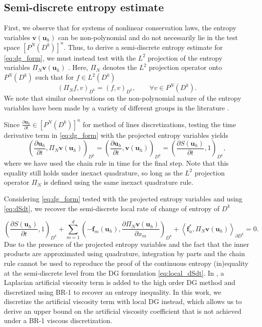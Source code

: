 \documentclass{elsarticle}
\theoremstyle{definition}
\theoremstyle{plain}
\theoremstyle{plain}
\newcommand{\pd}[2]{\frac{\partial#1}{\partial#2}}
\newcommand{\LRp}[1]{\left( #1 \right)} %
\newcommand{\LRs}[1]{\left[ #1 \right]} %
\newcommand{\LRa}[1]{\left\langle #1 \right\rangle} %
\newcommand{\refone}[1]{{\color{red}#1}}
\renewcommand{\refone}[1]{#1}
\begin{document}
\subsection{Semi-discrete entropy estimate}

First, we observe that for systems of nonlinear conservation laws, the entropy variables $\bm{v}(\bm{u}_h)$ can be non-polynomial and do not necessarily lie in the test space $\LRs{P^N(D^k)}^n$. Thus, to derive a semi-discrete entropy estimate for \eqref{eq:dg_form}, we must instead test with the $L^2$ projection of the entropy variables $\Pi_N \bm{v}(\bm{u}_h)$ \cite{chan2018discretely, chan2025artificial}. Here, $\Pi_N$ denotes the $L^2$ projection operator onto $P^N(D^k)$ such that for $f\in L^2(D^k)$
\[
\LRp{\Pi_N f, v}_{D^k} = \LRp{f, v}_{D^k}, \qquad \forall v \in P^N(D^k).
\]
We note that similar observations on the non-polynomial nature of the entropy variables have been made by a variety of different groups in the literature \cite{andrews2024high, chan2022entropyprojection, colombo2022entropy, gkanis2021new, williams2019analysis}. 

Since $\pd{\bm{u}_h}{t} \in \LRs{P^N\LRp{D^k}}^n$ for method of lines discretizations, testing the time derivative term in \eqref{eq:dg_form} with the projected entropy variables yields
\begin{equation}
\LRp{\pd{\bm{u}_h}{t}, \Pi_N\bm{v}(\bm{u}_h)}_{D^k} = \LRp{\pd{\bm{u}_h}{t}, \bm{v}(\bm{u}_h)}_{D^k} = \LRp{\pd{S(\bm{u}_h)}{t}, 1}_{D^k},
\label{eq:dSdt}
\end{equation}
where we have used the chain rule in time for the final step. Note that this equality still holds under inexact quadrature, so long as the $L^2$ projection operator $\Pi_N$ is defined using the same inexact quadrature rule. 

Considering \eqref{eq:dg_form} tested with the projected entropy variables and using \eqref{eq:dSdt}, we recover the semi-discrete local rate of change of entropy of $D^k$ 

\begin{equation}
\LRp{\pd{S(\bm{u}_h)}{t}, 1}_{D^k} + \sum_{m=1}^d \LRp{-\bm{f}_m(\bm{u}_h), \pd{\Pi_N\bm{v}(\bm{u}_h)}{x_m}}_{D^k} + \LRa{\bm{f}_n^*, \Pi_N\bm{v}(\bm{u}_h)}_{\partial D^k} = 0.
\label{eq:local_dSdt}
\end{equation}
Due to the presence of the projected entropy variables and the fact that the inner products are approximated using quadrature, integration by parts \refone{and} the chain rule cannot be used to reproduce the proof of the continuous entropy (in)equality at the semi-discrete level from the DG formulation  \eqref{eq:local_dSdt}. In \cite{chan2025artificial}, a Laplacian artificial viscosity term is added to the high order DG method and discretized using BR-1 to recover an entropy inequality. In this work, we discretize the artificial viscosity term with local DG \cite{cockburn2007analysis, cockburn1998local} instead, which allows us to derive an upper bound on the artificial viscosity coefficient that is not achieved under a BR-1 viscous discretization.
\end{document}
